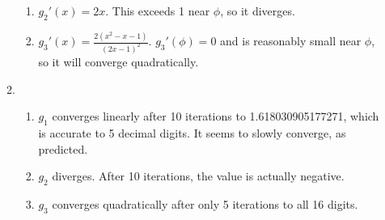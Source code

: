 \documentclass[12pt,letterpaper]{article}
\begin{document}
\begin{enumerate}
\begin{enumerate}
\begin{enumerate}
          \item $g_2'(x) = 2x$. This exceeds 1 near $\phi$, so it diverges.
          \item $g_3'(x) = \frac{2(x^2-x-1)}{(2x-1)^2}$. $g_3'(\phi) = 0$ and
            is reasonably small near $\phi$, so it will converge quadratically.
        \end{enumerate}
      \item
        \begin{enumerate}
          \item $g_1$ converges linearly after 10 iterations to
            1.618030905177271, which is accurate to 5 decimal digits. It seems
            to slowly converge, as predicted.
          \item $g_2$ diverges. After 10 iterations, the value is actually
            negative.
          \item $g_3$ converges quadratically after only 5 iterations to all 16
            digits.
        \end{enumerate}
    \end{enumerate}


\end{enumerate}
\end{document}
